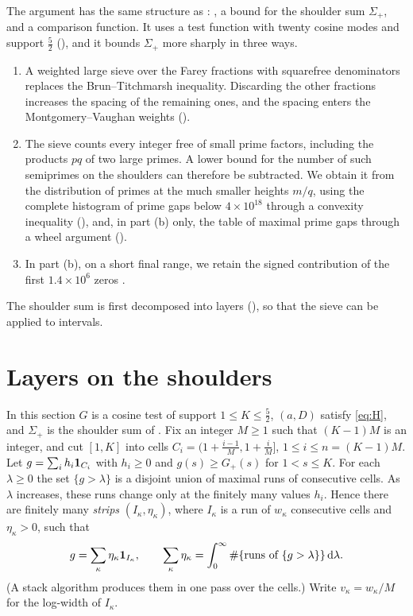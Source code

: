 \documentclass[11pt,colorlinks]{charlie}
\begin{document}
The argument has the same structure as : , a bound for the shoulder sum $\Sigma_+$, and a comparison function. It uses a test function with twenty cosine modes and support $\frac52$ (), and it bounds $\Sigma_+$ more sharply in three ways.
\begin{enumerate}
\item A weighted large sieve over the Farey fractions with squarefree denominators replaces the Brun--Titchmarsh inequality. Discarding the other fractions increases the spacing of the remaining ones, and the spacing enters the Montgomery--Vaughan weights ().
\item The sieve counts every integer free of small prime factors, including the products $pq$ of two large primes. A lower bound for the number of such semiprimes on the shoulders can therefore be subtracted. We obtain it from the distribution of primes at the much smaller heights $m/q$, using the complete histogram of prime gaps below $4\times10^{18}$ \cite{OeSHP} through a convexity inequality (), and, in part (b) only, the table of maximal prime gaps \cite{RecordGaps} through a wheel argument ().
\item In part (b), on a short final range, we retain the signed contribution of the first $1.4\times10^6$ zeros \cite{Platt,LMFDB}.
\end{enumerate}
The shoulder sum is first decomposed into layers (), so that the sieve can be applied to intervals.

\section{Layers on the shoulders}\label{sec:shoulders}
In this section $G$ is a cosine test of support $1\le K\le\frac52$, $(a,D)$ satisfy \eqref{eq:H}, and $\Sigma_+$ is the shoulder sum of .
Fix an integer $M\ge1$ such that $(K-1)M$ is an integer, and cut $[1,K]$ into cells $C_i=(1+\frac{i-1}M,1+\frac iM]$, $1\le i\le n=(K-1)M$. Let $g=\sum_ih_i\mathbf{1}_{C_i}$ with $h_i\ge0$ and $g(s)\ge G_+(s)$ for $1<s\le K$. For each $\lambda\ge0$ the set $\{g>\lambda\}$ is a disjoint union of maximal runs of consecutive cells. As $\lambda$ increases, these runs change only at the finitely many values $h_i$. Hence there are finitely many \emph{strips} $(I_\kappa,\eta_\kappa)$, where $I_\kappa$ is a run of $w_\kappa$ consecutive cells and $\eta_\kappa>0$, such that
\begin{equation}\label{eq:strips}
 g=\sum_\kappa\eta_\kappa\mathbf{1}_{I_\kappa},\qquad\sum_\kappa\eta_\kappa=\int_0^\infty\#\{\text{runs of }\{g>\lambda\}\}\,\mathrm{d}\lambda .
\end{equation}
(A stack algorithm produces them in one pass over the cells.) Write $v_\kappa=w_\kappa/M$ for the log-width of $I_\kappa$.
\end{document}
